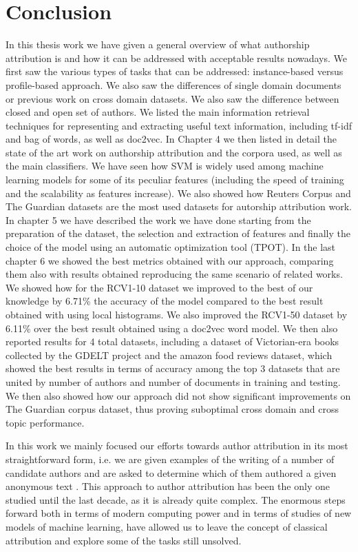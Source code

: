 \chapter{Conclusion}
In this thesis work we have given a general overview of what authorship attribution is and how it can be addressed with acceptable results nowadays.
We first saw the various types of tasks that can be addressed: instance-based versus profile-based approach. We also saw the differences of single domain documents or previous work on cross domain datasets. We also saw the difference between closed and open set of authors.
We listed the main information retrieval techniques for representing and extracting useful text information, including tf-idf and bag of words, as well as doc2vec.
In Chapter 4 we then listed in detail the state of the art work on authorship attribution and the corpora used, as well as the main classifiers. We have seen how SVM is widely used among machine learning models for some of its peculiar features (including the speed of training and the scalability as features increase). We also showed how Reuters Corpus and The Guardian datasets are the most used datasets for autorship attribution work.
In chapter 5 we have described the work we have done starting from the preparation of the dataset, the selection and extraction of features and finally the choice of the model using an automatic optimization tool (TPOT).
In the last chapter 6 we showed the best metrics obtained with our approach, comparing them also with results obtained reproducing the same scenario of related works.
We showed how for the RCV1-10 dataset we improved to the best of our knowledge by 6.71\% the accuracy of the model compared to the best result obtained with using local histograms. We also improved the RCV1-50 dataset by 6.11\% over the best result obtained using a doc2vec word model.
We then also reported results for 4 total datasets, including a dataset of Victorian-era books collected by the GDELT project and the amazon food reviews dataset, which showed the best results in terms of accuracy among the top 3 datasets that are united by number of authors and number of documents in training and testing.
We then also showed how our approach did not show significant improvements on The Guardian corpus dataset, thus proving suboptimal cross domain and cross topic performance.


In this work we mainly focused our efforts towards author attribution in its most straightforward form, i.e. we are given examples of the writing of a number of candidate authors and are asked
to determine which of them authored a given anonymous text \cite{koppel2009computational}.
This approach to author attribution has been the only one studied until the last decade, as it is already quite complex.
The enormous steps forward both in terms of modern computing power and in terms of studies of new models of machine learning, have allowed us to leave the concept of classical attribution and explore some of the tasks still unsolved. 

